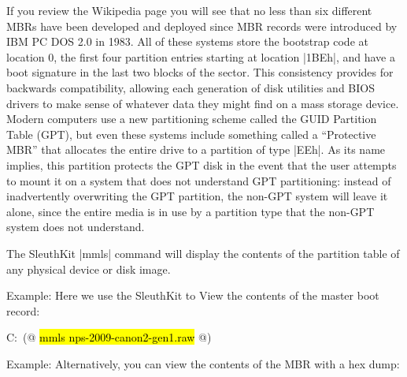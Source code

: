 If you review the Wikipedia page you will see that no less than six
different MBRs have been developed and deployed since
MBR records were introduced by IBM PC DOS 2.0 in 1983. All of these
systems store the bootstrap code at location 0, the first four
partition entries starting at location |1BEh|, and have a boot
signature in the last two blocks of the sector. This consistency 
provides for backwards compatibility, allowing each 
generation of disk utilities and BIOS drivers to make sense of
whatever data they might find on a mass storage device.  Modern
computers use a new partitioning scheme called the GUID Partition
Table (GPT), but even these systems include something called
a ``Protective MBR'' that allocates the entire drive to a partition of
type |EEh|. As its name implies, this partition protects the GPT disk in the
event that the user attempts to mount it on a system that does not
understand GPT partitioning: instead of inadvertently overwriting the
GPT partition, the non-GPT system will leave it alone, since the
entire media is in use by a partition type that the non-GPT system does not understand.

The SleuthKit |mmls| command will display the contents of the
partition table of any physical device or disk image.

Example: Here we use the SleuthKit to View the contents of the master boot
record:

\begin{code}
C:\ (@ \hl{mmls nps-2009-canon2-gen1.raw} @)
\end{code}

Example: Alternatively, you can view the contents of the MBR with a
hex dump:

